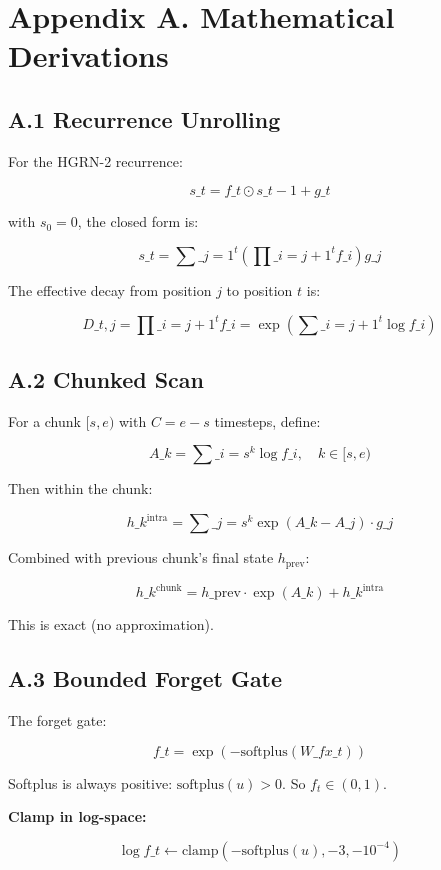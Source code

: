 \section{Appendix A. Mathematical Derivations}

\subsection{A.1 Recurrence Unrolling}

For the HGRN-2 recurrence:

\[
s\_t = f\_t \odot s\_{t-1} + g\_t
\tag{A.1}
\]

with $s_0 = 0$, the closed form is:

\[
s\_t = \sum\_{j=1}^{t} \left( \prod\_{i=j+1}^{t} f\_i \right) g\_j
\tag{A.2}
\]

The effective decay from position $j$ to position $t$ is:

\[
D\_{t, j} = \prod\_{i=j+1}^{t} f\_i = \exp\left(\sum\_{i=j+1}^{t} \log f\_i\right)
\tag{A.3}
\]

\subsection{A.2 Chunked Scan}

For a chunk $[s, e)$ with $C = e - s$ timesteps, define:

\[
A\_k = \sum\_{i=s}^{k} \log f\_i, \quad k \in [s, e)
\tag{A.4}
\]

Then within the chunk:

\[
h\_k^\text{intra} = \sum\_{j=s}^{k} \exp(A\_k - A\_j) \cdot g\_j
\tag{A.5}
\]

Combined with previous chunk's final state $h_\text{prev}$:

\[
h\_k^\text{chunk} = h\_\text{prev} \cdot \exp(A\_k) + h\_k^\text{intra}
\tag{A.6}
\]

This is exact (no approximation).

\subsection{A.3 Bounded Forget Gate}

The forget gate:

\[
f\_t = \exp(-\text{softplus}(W\_f x\_t))
\tag{A.7}
\]

Softplus is always positive: $\text{softplus}(u) > 0$. So $f_t \in (0, 1)$.

\textbf{Clamp in log-space:}

\[
\log f\_t \leftarrow \text{clamp}(- \text{softplus}(u), -3, -10^{-4})
\tag{A.8}
\]

